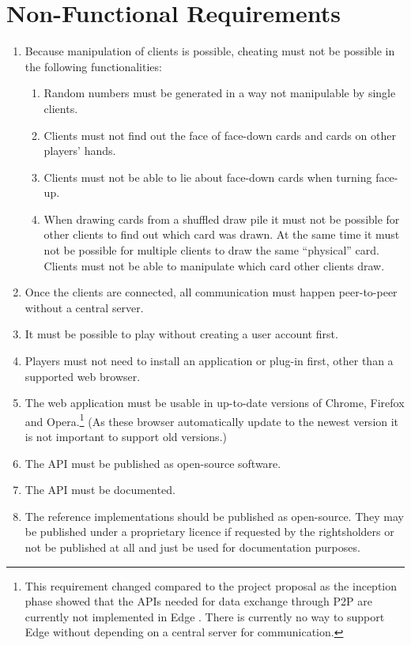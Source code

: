 \section{Non-Functional Requirements}

\begin{enumerate}
  \item Because manipulation of clients is possible, cheating must not be
  possible in the following functionalities:
  \begin{enumerate}
    \item Random numbers must be generated in a way not manipulable by single
    clients.
    \item Clients must not find out the \gls{face} of \gls{face}-down cards and
    cards on other players' \glspl{hand}.
    \item Clients must not be able to lie about \gls{face}-down cards when
    turning \gls{face}-up.
    \item When drawing cards from a shuffled \gls{draw pile} it must not be
    possible for other clients to find out which card was drawn. At the same
    time it must not be possible for multiple clients to draw the same
    ``physical'' card. Clients must not be able to manipulate which card other
    clients draw.
  \end{enumerate}
  \item Once the clients are connected, all communication must happen
  \gls{peer-to-peer} without a central server.
  \item It must be possible to play without creating a user account first.
  \item Players must not need to install an application or plug-in first, other
  than a supported web browser.
  \item The web application must be usable in up-to-date versions of Chrome,
  Firefox and Opera.\footnote{This requirement changed compared to the project
  proposal as the inception phase showed that the APIs needed for data exchange
  through \gls{P2P} are currently not implemented in Edge
  \cite{Microsoft2016datachannels}. There is currently no way to support Edge
  without depending on a central server for communication.} (As these browser
  automatically update to the newest version it is not important to support old
  versions.)
  \item The API must be published as open-source software.
  \item The API must be documented.
  \item The reference implementations should be published as open-source. They
  may be published under a proprietary licence if requested by the rightsholders
  or not be published at all and just be used for documentation purposes.
\end{enumerate}

